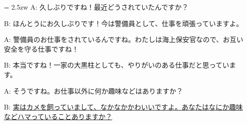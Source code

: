 \documentclass[11pt]{amsart}
\title{}
\author{}
\newenvironment{hangall}[1]{\hangindent = 2.5zw\everypar{\hangindent = 2.5zw}}{}
\begin{document}
\maketitle
\begin{hangall}{}%
A: 久しぶりですね！最近どうされていたんですか？

B: ほんとうにお久しぶりです！今は警備員として、仕事を頑張っていますよ。

A: 警備員のお仕事をされているんですね。わたしは海上保安官なので、お互い安全を守る仕事ですね！

B: 本当ですね！一家の大黒柱としても、やりがいのある仕事だと思っています。

A: そうですね。お仕事以外に何か趣味などはありますか？

B: \ul{実はカメを飼っていまして、なかなかかわいいですよ。あなたはなにか趣味などハマっていることありますか？}\end{hangall}
\end{document}
